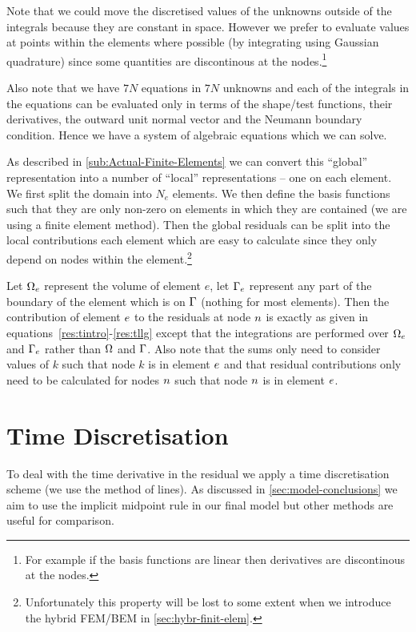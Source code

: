 Note that we could move the discretised values of the unknowns outside of the integrals because they are constant in space. However we prefer to evaluate values at points within the elements where possible (by integrating using Gaussian quadrature) since some quantities are discontinous at the nodes.\footnote{For example if the basis functions are linear then derivatives are discontinous at the nodes.}

Also note that we have $7N$ equations in $7N$ unknowns and each of the integrals in the equations can be evaluated only in terms of the shape/test functions, their derivatives, the outward unit normal vector and the Neumann boundary condition. Hence we have a system of algebraic equations which we can solve.

As described in \autoref{sub:Actual-Finite-Elements} we can convert this ``global'' representation into a number of ``local'' representations -- one on each element. We first split the domain into $N_e$ elements. We then define the basis functions such that they are only non-zero on elements in which they are contained (\ie we are using a finite element method). Then the global residuals can be split into the local contributions each element which are easy to calculate since they only depend on nodes within the element.\footnote{Unfortunately this property will be lost to some extent when we introduce the hybrid FEM/BEM in \autoref{sec:hybr-finit-elem}.}

Let $\Omega_e$ represent the volume of element $e$, let ${\Gamma}_e$ represent any part of the boundary of the element which is on ${\Gamma}$ (nothing for most elements). Then the contribution of element $e$ to the residuals at node $n$ is exactly as given in equations~\eqref{res:tintro}-\eqref{res:tllg} except that the integrations are performed over $\Omega_e$ and ${\Gamma}_e$ rather than $\Omega$ and ${\Gamma}$. Also note that the sums only need to consider values of $k$ such that node $k$ is in element $e$ and that residual contributions only need to be calculated for nodes $n$ such that node $n$ is in element $e$.


\section{Time Discretisation}
\label{sec:time-discretisation-resi}

To deal with the time derivative in the residual we apply a time discretisation scheme (\ie we use the method of lines). As discussed in \autoref{sec:model-conclusions} we aim to use the implicit midpoint rule in our final model but other methods are useful for comparison.

